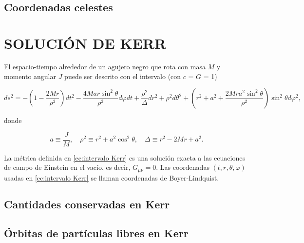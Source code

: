 \documentclass[11pt]{article}
\begin{document}
\subsection{Coordenadas celestes}

\newpage

\section{SOLUCIÓN DE KERR}

El espacio-tiempo alrededor de un agujero negro que rota con masa $M$ y momento angular $J$ puede ser descrito con el intervalo (con $c$ = $G$ = 1)

\begin{equation}
ds^{2} = -\left( 1 - \dfrac{2Mr}{\rho^{2}} \right)dt^{2} - \dfrac{4Mar\sin^{2}\theta}{\rho^{2}}d\varphi dt + \dfrac{\rho^{2}}{\Delta}dr^{2} + \rho^{2}d\theta^{2} + \left( r^{2} + a^{2} + \dfrac{2Mra^{2}\sin^{2}\theta}{\rho^{2}} \right) \sin^{2}\theta d\varphi^{2},
\label{ec:intervalo Kerr}
\end{equation}

donde

\begin{equation}
a \equiv \dfrac{J}{M}, \quad \rho^{2} \equiv r^{2} + a^{2}\cos^{2}\theta, \quad \Delta \equiv r^{2} - 2Mr + a^{2}. 
\label{ec:definiciones en Kerr}
\end{equation}

La métrica definida en \eqref{ec:intervalo Kerr} es una solución exacta a las ecuaciones de campo de Einstein en el vacío, es decir, $G_{\mu\nu} = 0$. Las coordenadas $(t, r, \theta, \varphi)$ usadas en \eqref{ec:intervalo Kerr} se llaman coordenadas de Boyer-Lindquist. 

\subsection{Cantidades conservadas en Kerr}


\subsection{Órbitas de partículas libres en Kerr}



	
\end{document}
